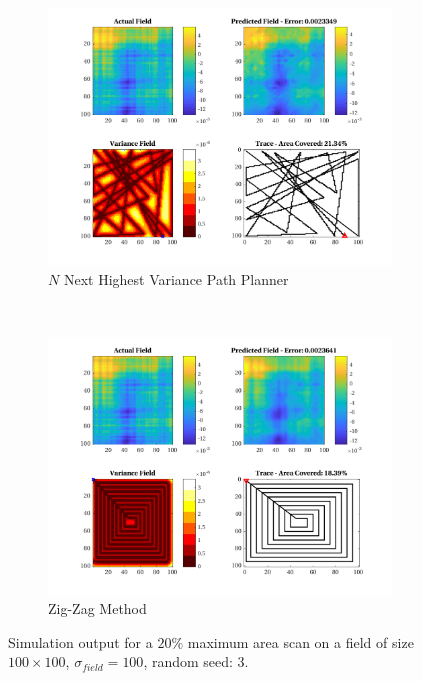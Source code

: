 \begin{figure}[htb!]
\begin{subfigure}[t]{0.5\textwidth}
    \end{subfigure}%
    \\
    \begin{subfigure}[t]{0.5\textwidth}
        \centering
        \includegraphics[width=\linewidth]{figures/hbresults/nnhv_20p_100x100_sf_100_seed_3.png}
        \captionsetup{skip=0.10\baselineskip,size=footnotesize}
        \caption{$N$ Next Highest Variance Path Planner}
    \end{subfigure}%
    ~
    \begin{subfigure}[t]{0.5\textwidth}
        \centering
        \includegraphics[width=\linewidth]{figures/hbresults/zz_20p_100x100_sf_100_seed_3.png}
        \captionsetup{skip=0.10\baselineskip,size=footnotesize}
        \caption{Zig-Zag Method}
    \end{subfigure}%
    \captionsetup{skip=0.20\baselineskip}
    \caption{Simulation output for a $20\%$ maximum area scan on a field of size $100 \times 100$, $\sigma_{field} = 100$, random seed: 3.}
    \label{fig:sim_sigma100_p20_s3}
\end{figure}


